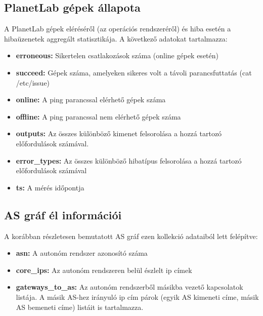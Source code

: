 \subsection*{PlanetLab gépek állapota}
A PlanetLab gépek eléréséről (az operációs rendszeréről) és hiba esetén a hibaüzenetek aggregált statisztikája. A következő adatokat tartalmazza:

\begin{itemize}
\item \textbf{erroneous:} Sikertelen csatlakozások száma (online gépek esetén)
\item \textbf{succeed:} Gépek száma, amelyeken sikeres volt a távoli parancsfuttatás (cat /etc/issue)
\item \textbf{online:} A ping parancssal elérhető gépek száma
\item \textbf{offline:} A ping parancssal nem elérhető gépek száma
\item \textbf{outputs:} Az összes különböző kimenet felsorolása a hozzá tartozó előfordulások számával.
\item \textbf{error\_types:} Az összes különböző hibatípus felsorolása a hozzá tartozó előfordulások számával
\item \textbf{ts:} A mérés időpontja
\end{itemize}

\subsection*{AS gráf él információi}
A korábban részletesen bemutatott AS gráf ezen kollekció adataiból lett felépítve:

\begin{itemize}
\item \textbf{asn:} A autonóm rendszer azonosító száma
\item \textbf{core\_ips:} Az autonóm rendszeren belül észlelt ip címek
\item \textbf{gateways\_to\_as:} Az autonóm rendszerből másikba vezető kapcsolatok listája. A másik AS-hez irányuló ip cím párok (egyik AS kimeneti címe, másik AS bemeneti címe) listáit is tartalmazza.
\end{itemize}

